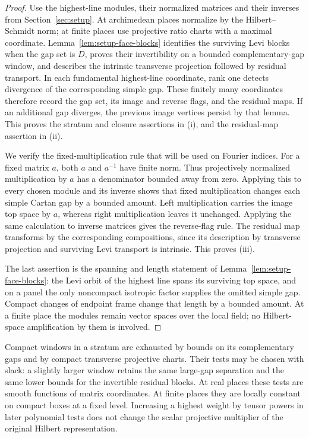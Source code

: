 \begin{proof}
Use the highest-line modules, their normalized matrices and their inverses
from Section~\ref{sec:setup}. At archimedean places normalize by the
Hilbert--Schmidt norm; at finite places use projective ratio charts
with a maximal coordinate. Lemma~\ref{lem:setup-face-blocks} identifies
the surviving Levi blocks when the gap set is $D$, proves their
invertibility on a bounded complementary-gap window, and describes the
intrinsic transverse projection followed by residual transport. In each
fundamental highest-line coordinate, rank one detects divergence of the
corresponding simple gap. These finitely many coordinates therefore
record the gap set, its image and reverse flags, and the residual maps.
If an additional gap diverges, the previous image vertices persist by
that lemma. This proves the stratum and closure assertions in
\textup{(i)}, and the residual-map assertion in \textup{(ii)}.

We verify the fixed-multiplication rule that will be used on Fourier
indices. For a fixed matrix $a$, both $a$ and $a^{-1}$ have finite norm.
Thus projectively normalized multiplication by $a$ has a denominator
bounded away from zero. Applying this to every chosen module and its
inverse shows that fixed multiplication changes each simple Cartan gap
by a bounded amount. Left multiplication carries the image top space
by $a$, whereas right multiplication leaves it unchanged. Applying the
same calculation to inverse matrices gives the reverse-flag rule.
The residual map transforms by the corresponding compositions, since
its description by transverse projection and surviving Levi transport
is intrinsic. This proves \textup{(iii)}.

The last assertion is the spanning and length statement of
Lemma~\ref{lem:setup-face-blocks}: the Levi orbit of the highest line
spans its surviving top space, and on a panel the only noncompact
isotropic factor supplies the omitted simple gap. Compact changes of
endpoint frame change that length by a bounded amount. At a finite
place the modules remain vector spaces over the local field; no
Hilbert-space amplification by them is involved.
\end{proof}

Compact windows in a stratum are exhausted by bounds on its
complementary gaps and by compact transverse projective charts.
Their tests may be chosen with slack: a slightly larger window
retains the same large-gap separation and the same lower bounds for
the invertible residual blocks. At real places these tests are
smooth functions of matrix coordinates. At finite places they are
locally constant on compact boxes at a fixed level. Increasing a
highest weight by tensor powers in later polynomial tests does not
change the scalar projective multiplier of the original Hilbert
representation.

